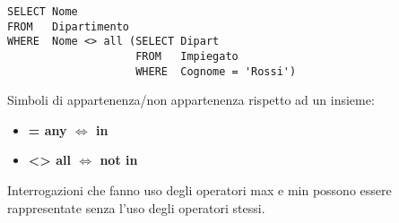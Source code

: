 \begin{lstlisting}
SELECT Nome
FROM   Dipartimento
WHERE  Nome <> all (SELECT Dipart
                    FROM   Impiegato
                    WHERE  Cognome = 'Rossi')
\end{lstlisting}

Simboli di appartenenza/non appartenenza rispetto ad un insieme:

\begin{itemize}
	\item \textbf{= any \(\Leftrightarrow\) in}
	\item \textbf{<> all \(\Leftrightarrow\) not in}
\end{itemize}

Interrogazioni che fanno uso degli operatori max e min possono essere rappresentate senza l'uso degli operatori stessi.

